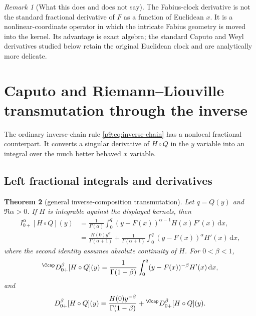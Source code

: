 \documentclass[11pt,oneside]{article}
\newtheorem{theorem}{Theorem}[section]
\theoremstyle{definition}
\theoremstyle{remark}
\newtheorem{remark}[theorem]{Remark}
\newcommand{\dd}{\,\mathrm d}
\newcommand{\1}{\mathbf 1}
\begin{document}
\begin{remark}[What this does and does not say]
The Fabius-clock derivative is not the standard fractional derivative of
$F$ as a function of Euclidean $x$.  It is a nonlinear-coordinate operator in
which the intricate Fabius geometry is moved into the kernel.  Its advantage
is exact algebra; the standard Caputo and Weyl derivatives studied below
retain the original Euclidean clock and are analytically more delicate.
\end{remark}

\section{Caputo and Riemann--Liouville transmutation through the inverse}
\label{p9:sec:inverse-transmutation}

The ordinary inverse-chain rule \cref{p9:eq:inverse-chain} has a nonlocal
fractional counterpart.  It converts a singular derivative of $H\circ Q$ in
the $y$ variable into an integral over the much better behaved $x$ variable.

\subsection{Left fractional integrals and derivatives}

\begin{theorem}[general inverse-composition transmutation]
\label{p9:thm:left-transmutation}
Let $q=Q(y)$ and $\Re\alpha>0$.  If $H$ is integrable against the displayed
kernels, then
\begin{align}
 I_{0+}^\alpha[H\circ Q](y)
 &=\frac1{\Gamma(\alpha)}
   \int_0^q(y-F(x))^{\alpha-1}H(x)F'(x)\dd x,
 \label{p9:eq:inverse-RL-substitution}\\
 &=\frac{H(0)y^\alpha}{\Gamma(\alpha+1)}
   +\frac1{\Gamma(\alpha+1)}
    \int_0^q(y-F(x))^\alpha H'(x)\dd x,
 \label{p9:eq:inverse-RL-parts}
\end{align}
where the second identity assumes absolute continuity of $H$.
For $0<\beta<1$,
\begin{equation}
 {}^{\Ccap}D_{0+}^\beta[H\circ Q](y)
 =\frac1{\Gamma(1-\beta)}
  \int_0^q(y-F(x))^{-\beta}H'(x)\dd x,
 \label{p9:eq:inverse-Caputo-transmutation}
\end{equation}
and
\begin{equation}
 D_{0+}^\beta[H\circ Q](y)
 =\frac{H(0)y^{-\beta}}{\Gamma(1-\beta)}
  +{}^{\Ccap}D_{0+}^\beta[H\circ Q](y).
 \label{p9:eq:inverse-RL-vs-Caputo}
\end{equation}
\end{theorem}
\end{document}
